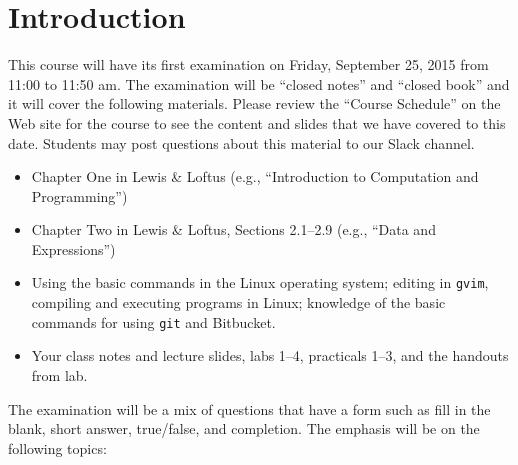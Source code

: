 


\section*{Introduction}

This course will have its first examination on Friday, September 25, 2015 from 11:00 to 11:50 am. The examination will be ``closed
notes'' and ``closed book'' and it will cover the following materials. Please review the ``Course Schedule'' on the Web
site for the course to see the content and slides that we have covered to this date. Students may post questions about
this material to our Slack channel.

\begin{itemize}

  \itemsep 0in

  \item Chapter One in Lewis \& Loftus (e.g., ``Introduction to Computation and Programming'')

  \item Chapter Two in Lewis \& Loftus, Sections 2.1--2.9 (e.g., ``Data and Expressions'')

  \item Using the basic commands in the Linux operating system; editing in {\tt gvim}, compiling and executing
    programs in Linux; knowledge of the basic commands for using {\tt git} and Bitbucket.

  \item Your class notes and lecture slides, labs 1--4, practicals 1--3, and the handouts from lab.

\end{itemize}

\noindent The examination will be a mix of questions that have a form such as fill in the blank, short answer, true/false, and
completion.  The emphasis will be on the following topics:

